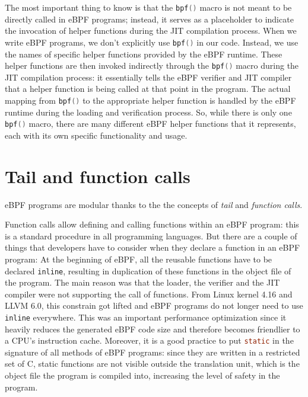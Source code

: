 The most important thing to know is that the \colorbox{backcolour}{\lstinline[style=cstyle, language=C]|bpf()|} macro is not meant to be directly called in eBPF programs; instead, it serves as a placeholder to indicate the invocation of helper functions during the JIT compilation process.
When we write eBPF programs, we don't explicitly use \colorbox{backcolour}{\lstinline[style=cstyle, language=C]|bpf()|} in our code. 
Instead, we use the names of specific helper functions provided by the eBPF runtime.
These helper functions are then invoked indirectly through the \colorbox{backcolour}{\lstinline[style=cstyle, language=C]|bpf()|} macro during the JIT compilation process: it essentially tells the eBPF verifier and JIT compiler that a helper function is being called at that point in the program. 
The actual mapping from \colorbox{backcolour}{\lstinline[style=cstyle, language=C]|bpf()|} to the appropriate helper function is handled by the eBPF runtime during the loading and verification process.
So, while there is only one \colorbox{backcolour}{\lstinline[style=cstyle, language=C]|bpf()|} macro, there are many different eBPF helper functions that it represents, each with its own specific functionality and usage.

\section{Tail and function calls}

eBPF programs are modular thanks to the the concepts of \textit{tail} and \textit{function calls}.
 
Function calls allow defining and calling functions within an eBPF program: this is a standard procedure in all programming languages. 
But there are a couple of things that developers have to consider when they declare a function in an eBPF program:
At the beginning of eBPF, all the reusable functions have to be declared \colorbox{backcolour}{\lstinline[style=cstyle, language=C]|inline|}, resulting in duplication of these functions in the object file of the program.
The main reason was that the loader, the verifier and the JIT compiler were not supporting the call of functions.
From Linux kernel 4.16 and LLVM 6.0, this constrain got lifted and eBPF programs do not longer need to use \colorbox{backcolour}{\lstinline[style=cstyle, language=C]|inline|} everywhere.
This was an important performance optimization since it heavily reduces the generated eBPF code size and therefore becomes friendlier to a CPU’s instruction cache.
Moreover, it is a good practice to put \colorbox{backcolour}{\lstinline[style=cstyle, language=C]|static|} in the signature of all methods of eBPF programs: since they are written in a restricted set of C, static functions are not	visible outside the translation unit, which is the object file the program is compiled into, increasing the level of safety in the program.

